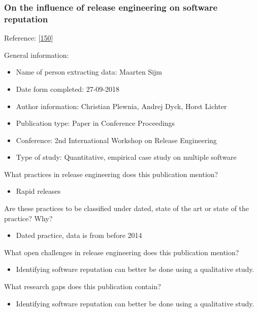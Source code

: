 \documentclass[]{book}
\providecommand{\tightlist}{%
  \setlength{\itemsep}{0pt}\setlength{\parskip}{0pt}}
\begin{document}
\subsubsection{On the influence of release engineering on software
reputation}\label{on-the-influence-of-release-engineering-on-software-reputation}

Reference: {[}\protect\hyperlink{ref-plewnia2014a}{150}{]}

General information:

\begin{itemize}
\tightlist
\item
  Name of person extracting data: Maarten Sijm
\item
  Date form completed: 27-09-2018
\item
  Author information: Christian Plewnia, Andrej Dyck, Horst Lichter
\item
  Publication type: Paper in Conference Proceedings
\item
  Conference: 2nd International Workshop on Release Engineering
\item
  Type of study: Quantitative, empirical case study on multiple software
\end{itemize}

What practices in release engineering does this publication mention?

\begin{itemize}
\tightlist
\item
  Rapid releases
\end{itemize}

Are these practices to be classified under dated, state of the art or
state of the practice? Why?

\begin{itemize}
\tightlist
\item
  Dated practice, data is from before 2014
\end{itemize}

What open challenges in release engineering does this publication
mention?

\begin{itemize}
\tightlist
\item
  Identifying software reputation can better be done using a qualitative
  study.
\end{itemize}

What research gaps does this publication contain?

\begin{itemize}
\tightlist
\item
  Identifying software reputation can better be done using a qualitative
  study.
\end{itemize}
\end{document}

